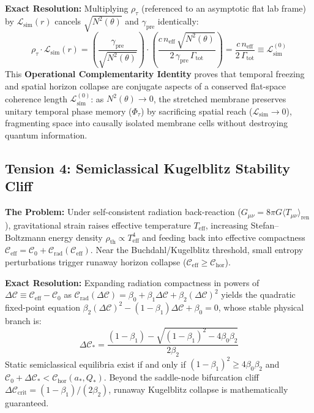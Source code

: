 \documentclass[11pt,a4paper]{article}
\begin{document}
\textbf{Exact Resolution:} Multiplying $\rho_\tau$ (referenced to an asymptotic flat lab frame) by $\mathcal{L}_{\mathrm{sim}}(r)$ cancels $\sqrt{N^2(\theta)}$ and $\gamma_{\mathrm{pre}}$ identically:
\begin{equation}
    \rho_\tau \cdot \mathcal{L}_{\mathrm{sim}}(r) = \left(\frac{\gamma_{\mathrm{pre}}}{\sqrt{N^2(\theta)}}\right) \cdot \left(\frac{c \, n_{\mathrm{eff}} \, \sqrt{N^2(\theta)}}{2 \, \gamma_{\mathrm{pre}} \, \Gamma_{\mathrm{tot}}}\right) = \frac{c \, n_{\mathrm{eff}}}{2 \, \Gamma_{\mathrm{tot}}} \equiv \mathcal{L}_{\mathrm{sim}}^{(0)}
\end{equation}
This \textbf{Operational Complementarity Identity} proves that temporal freezing and spatial horizon collapse are conjugate aspects of a conserved flat-space coherence length $\mathcal{L}_{\mathrm{sim}}^{(0)}$: as $N^2(\theta) \to 0$, the stretched membrane preserves unitary temporal phase memory ($\Phi_\tau$) by sacrificing spatial reach ($\mathcal{L}_{\mathrm{sim}} \to 0$), fragmenting space into causally isolated membrane cells without destroying quantum information.

\subsection{Tension 4: Semiclassical Kugelblitz Stability Cliff}
\textbf{The Problem:} Under self-consistent radiation back-reaction ($G_{\mu\nu} = 8\pi G \langle T_{\mu\nu} \rangle_{\mathrm{ren}}$), gravitational strain raises effective temperature $T_{\mathrm{eff}}$, increasing Stefan--Boltzmann energy density $\rho_{\mathrm{th}} \propto T_{\mathrm{eff}}^4$ and feeding back into effective compactness $\mathcal{C}_{\mathrm{eff}} = \mathcal{C}_0 + \mathcal{C}_{\mathrm{rad}}(\mathcal{C}_{\mathrm{eff}})$. Near the Buchdahl/Kugelblitz threshold, small entropy perturbations trigger runaway horizon collapse ($\mathcal{C}_{\mathrm{eff}} \ge \mathcal{C}_{\mathrm{hor}}$).

\textbf{Exact Resolution:} Expanding radiation compactness in powers of $\Delta\mathcal{C} \equiv \mathcal{C}_{\mathrm{eff}} - \mathcal{C}_0$ as $\mathcal{C}_{\mathrm{rad}}(\Delta\mathcal{C}) = \beta_0 + \beta_1 \Delta\mathcal{C} + \beta_2 (\Delta\mathcal{C})^2$ yields the quadratic fixed-point equation $\beta_2 (\Delta\mathcal{C})^2 - (1 - \beta_1)\Delta\mathcal{C} + \beta_0 = 0$, whose stable physical branch is:
\begin{equation}
    \Delta\mathcal{C}_* = \frac{(1 - \beta_1) - \sqrt{(1 - \beta_1)^2 - 4\beta_0\beta_2}}{2\beta_2}
\end{equation}
Static semiclassical equilibria exist if and only if $(1 - \beta_1)^2 \ge 4\beta_0\beta_2$ and $\mathcal{C}_0 + \Delta\mathcal{C}_* < \mathcal{C}_{\mathrm{hor}}(a_*, Q_*)$. Beyond the saddle-node bifurcation cliff $\Delta\mathcal{C}_{\mathrm{crit}} = (1 - \beta_1)/(2\beta_2)$, runaway Kugelblitz collapse is mathematically guaranteed.
\end{document}
